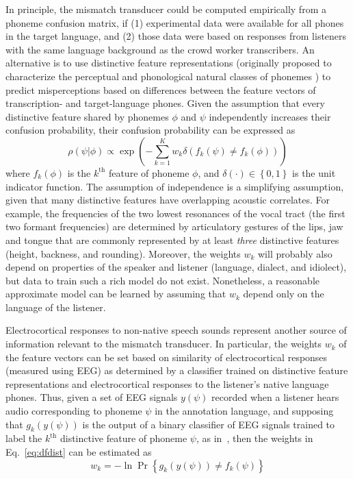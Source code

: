 In principle, the mismatch transducer could be computed empirically from 
a phoneme confusion matrix, if (1) experimental data were available for 
all phones in the target language, and (2) those data were based on 
responses from listeners with the same language background as the crowd 
worker transcribers. An alternative is to use distinctive feature 
representations (originally proposed to characterize the perceptual and 
phonological natural classes of phonemes \cite{Jakobson52}) to predict 
misperceptions based on differences between the feature vectors of 
transcription- and target-language phones. Given the assumption that 
every distinctive feature shared by phonemes $\phi$ and $\psi$ 
independently increases their confusion probability, their confusion 
probability can be expressed as
\begin{equation}
  \rho(\psi|\phi)\propto \exp\left(-\sum_{k=1}^K
  w_k\delta\left(f_k(\psi)\ne f_k(\phi)\right)\right)
  \label{eq:dfdist}
\end{equation}
where $f_k(\phi)$ is the $k^{\textrm{th}}$ feature of phoneme $\phi$,
and $\delta(\cdot)\in\left\{0,1\right\}$ is the unit indicator
function. The assumption of independence is a simplifying assumption, 
given that many distinctive features have overlapping acoustic 
correlates. For example, the frequencies of the two lowest resonances of
the vocal tract (the first two formant frequencies) are determined by 
articulatory gestures of the lips, jaw and tongue that are
commonly represented by at least {\em three} distinctive features
(height, backness, and rounding). Moreover, the weights $w_k$ will 
probably also depend on properties of the speaker and listener 
(language, dialect, and idiolect), but data to train such a rich model 
do not exist. Nonetheless, a reasonable approximate model can be learned 
by assuming that $w_k$ depend only on the language of the listener.

Electrocortical responses to non-native speech sounds represent another
source of information relevant to the mismatch transducer. In particular,  
the weights $w_k$ of the feature vectors can be set based on similarity
of electrocortical responses (measured using EEG) as determined by a
classifier trained on distinctive feature representations and
electrocortical responses to the listener's native language phones. Thus,
given a set of EEG signals $y(\psi)$ recorded when a listener
hears audio corresponding to phoneme $\psi$ in the annotation
language, and supposing that $g_k(y(\psi))$ is the output of a binary
classifier of EEG signals trained to label the $k^{\textrm{th}}$
distinctive feature of phoneme $\psi$, as in~\cite{Liberto15}, then
the weights in Eq.~\ref{eq:dfdist} can be estimated as
\begin{equation}
  w_k = -\ln\Pr\left\{g_k(y(\psi))\ne f_k(\psi)\right\}
  \label{eq:eegdist}
\end{equation}

